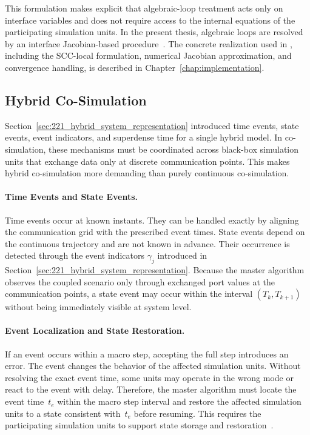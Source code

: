 This formulation makes explicit that algebraic-loop treatment acts only on interface variables and does not require access to the internal equations of the participating simulation units.
In the present thesis, algebraic loops are resolved by an interface Jacobian-based procedure~\cite{sicklinger_interface_2014}.
The concrete realization used in \syssimx{}, including the \ac{SCC}-local formulation, numerical Jacobian approximation, and convergence handling, is described in Chapter~\ref{chap:implementation}.

\subsection{Hybrid Co-Simulation}
\label{sec:236_cosim_hybrid}

Section~\ref{sec:221_hybrid_system_representation} introduced time events, state events, event indicators, and superdense time for a single hybrid model.
In co-simulation, these mechanisms must be coordinated across black-box simulation units that exchange data only at discrete communication points.
This makes hybrid co-simulation more demanding than purely continuous co-simulation.

\paragraph{Time Events and State Events.}
Time events occur at known instants.
They can be handled exactly by aligning the communication grid with the prescribed event times.
State events depend on the continuous trajectory and are not known in advance.
Their occurrence is detected through the event indicators $\gamma_j$ introduced in Section~\ref{sec:221_hybrid_system_representation}.
Because the master algorithm observes the coupled scenario only through exchanged port values at the communication points, a state event may occur within the interval $(T_k, T_{k+1})$ without being immediately visible at system level.

\paragraph{Event Localization and State Restoration.}
If an event occurs within a macro step, accepting the full step introduces an error.
The event changes the behavior of the affected simulation units.
Without resolving the exact event time, some units may operate in the wrong mode or react to the event with delay.
Therefore, the master algorithm must locate the event time~$t_e$ within the macro step interval and restore the affected simulation units to a state consistent with~$t_e$ before resuming.
This requires the participating simulation units to support state storage and restoration~\cite{gomes_co-simulation_2019}.

